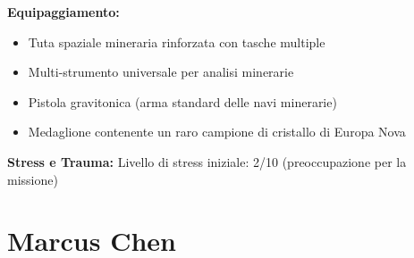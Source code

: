 \documentclass[11pt,a4paper]{article}
\begin{document}
\begin{tcolorbox}[colback=mininglightorange!20, colframe=miningorange]
\textbf{Equipaggiamento:}
\begin{itemize}[leftmargin=*]
\item Tuta spaziale mineraria rinforzata con tasche multiple
\item Multi-strumento universale per analisi minerarie
\item Pistola gravitonica (arma standard delle navi minerarie)
\item Medaglione contenente un raro campione di cristallo di Europa Nova
\end{itemize}

\textbf{Stress e Trauma:} Livello di stress iniziale: 2/10 (preoccupazione per la missione)
\end{tcolorbox}

\section{Marcus Chen}
\end{document}
